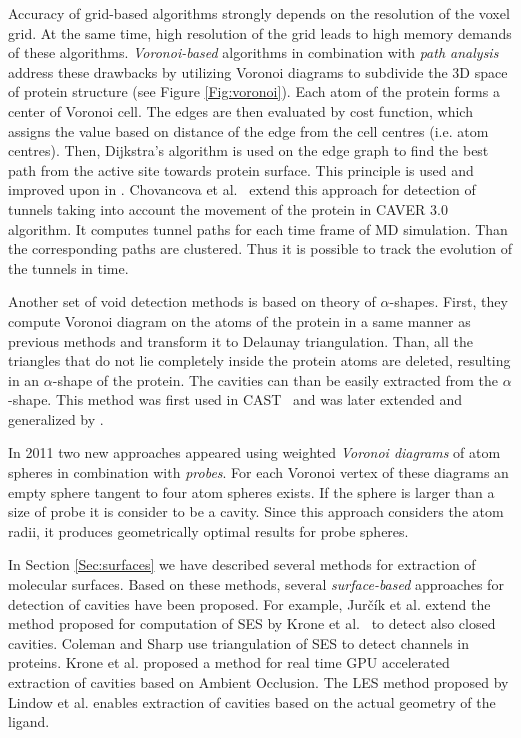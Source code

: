 Accuracy of grid-based algorithms strongly depends on the resolution of the voxel grid. At the same time, high resolution of the grid leads to high memory demands of these algorithms. \textit{Voronoi-based} algorithms in combination with \textit{path analysis} address these drawbacks by utilizing Voronoi diagrams to subdivide the 3D space of protein structure (see Figure \ref{Fig:voronoi}). Each atom of the protein forms a center of Voronoi cell. The edges are then evaluated by cost function, which assigns the value based on distance of the edge from the cell centres (i.e. atom centres). Then, Dijkstra's algorithm is used on the edge graph to find the best path from the active site towards protein surface. This principle is used and improved upon in \cite{Petrek2007MOLE, caver20, Yaffe2008MolAxis}. Chovancova et al.~\cite{caver30} extend this approach for detection of tunnels taking into account the movement of the protein in CAVER 3.0 algorithm. It computes tunnel paths for each time frame of MD simulation. Than the corresponding paths are clustered. Thus it is possible to track the evolution of the tunnels in time.

Another set of void detection methods is based on theory of $\alpha$-shapes. First, they compute Voronoi diagram on the atoms of the protein in a same manner as previous methods and transform it to Delaunay triangulation. Than, all the triangles that do not lie completely inside the protein atoms are deleted, resulting in an $\alpha$-shape of the protein. The cavities can than be easily extracted from the $\alpha$-shape. This method was first used in CAST~\cite{liang1998anatomy} and was later extended and generalized by \cite{sridharamurthy2016extraction, kim2013tunnels, masood2015chexvis}.

In 2011 two new approaches \cite{olechnovivc2010voroprot, Lindow2011Voronoi} appeared using weighted \textit{Voronoi diagrams} of atom spheres in combination with \textit{probes}. For each Voronoi vertex of these diagrams an empty sphere tangent to four atom spheres exists. If the sphere is larger than a size of probe it is consider to be a cavity. Since this approach considers the atom radii, it produces geometrically optimal results for probe spheres.

In Section \ref{Sec:surfaces} we have described several methods for extraction of molecular surfaces. Based on these methods, several \textit{surface-based} approaches for detection of cavities have been proposed. For example, Jurčík et al. \cite{jurvcik2016accelerated} extend the method proposed for computation of SES by Krone et al.~\cite{6094043} to detect also closed cavities. Coleman and Sharp \cite{Coleman2009CHUNNEL} use triangulation of SES to detect channels in proteins. Krone et al. \cite{krone2013interactive} proposed a method for real time GPU accelerated extraction of cavities based on Ambient Occlusion. The LES method proposed by Lindow et al. \cite{lindow2014ligand} enables extraction of cavities based on the actual geometry of the ligand.

